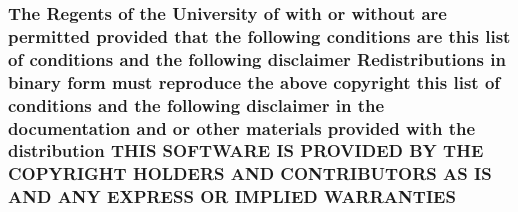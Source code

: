 \hypertarget{_l_i_c_e_n_s_e_a3f8645b457d8bdef4fd7c3549fc01039}{
\subsubsection[{W\+A\+R\+R\+A\+N\+T\+I\+E\+S}]{\setlength{\rightskip}{0pt plus 5cm}The Regents of the University of with or without are permitted provided that the following conditions are this list of conditions and the following disclaimer Redistributions in binary form must reproduce the above copyright this list of conditions and the following disclaimer in the documentation and or other materials provided with the distribution T\+H\+I\+S S\+O\+F\+T\+W\+A\+R\+E I\+S P\+R\+O\+V\+I\+D\+E\+D B\+Y T\+H\+E C\+O\+P\+Y\+R\+I\+G\+H\+T H\+O\+L\+D\+E\+R\+S A\+N\+D C\+O\+N\+T\+R\+I\+B\+U\+T\+O\+R\+S A\+S I\+S A\+N\+D A\+N\+Y E\+X\+P\+R\+E\+S\+S O\+R I\+M\+P\+L\+I\+E\+D W\+A\+R\+R\+A\+N\+T\+I\+E\+S}}\label{_l_i_c_e_n_s_e_a3f8645b457d8bdef4fd7c3549fc01039}
